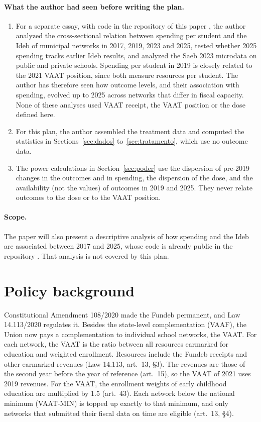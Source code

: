 \documentclass[11pt]{article}
\begin{document}
\paragraph{What the author had seen before writing the plan.}
\begin{enumerate}[label=(\alph*)]
\item For a separate essay, with code in the repository of this paper \citep{cunha2026}, the author analyzed the cross-sectional relation between spending per student and the Ideb of municipal networks in 2017, 2019, 2023 and 2025, tested whether 2025 spending tracks earlier Ideb results, and analyzed the Saeb 2023 microdata on public and private schools. Spending per student in 2019 is closely related to the 2021 VAAT position, since both measure resources per student. The author has therefore seen how outcome levels, and their association with spending, evolved up to 2025 across networks that differ in fiscal capacity. None of these analyses used VAAT receipt, the VAAT position or the dose defined here.
\item For this plan, the author assembled the treatment data and computed the statistics in Sections~\ref{sec:dados} to~\ref{sec:tratamento}, which use no outcome data.
\item The power calculations in Section~\ref{sec:poder} use the dispersion of pre-2019 changes in the outcomes and in spending, the dispersion of the dose, and the availability (not the values) of outcomes in 2019 and 2025. They never relate outcomes to the dose or to the VAAT position.
\end{enumerate}

\paragraph{Scope.} The paper will also present a descriptive analysis of how spending and the Ideb are associated between 2017 and 2025, whose code is already public in the repository \citep{cunha2026}. That analysis is not covered by this plan.

\section{Policy background}\label{sec:politica}

Constitutional Amendment 108/2020 made the Fundeb permanent, and Law 14.113/2020 regulates it. Besides the state-level complementation (VAAF), the Union now pays a complementation to individual school networks, the VAAT. For each network, the VAAT is the ratio between all resources earmarked for education and weighted enrollment. Resources include the Fundeb receipts and other earmarked revenues (Law 14.113, art.~13, \S3). The revenues are those of the second year before the year of reference (art.~15), so the VAAT of 2021 uses 2019 revenues. For the VAAT, the enrollment weights of early childhood education are multiplied by 1.5 (art.~43). Each network below the national minimum (VAAT-MIN) is topped up exactly to that minimum, and only networks that submitted their fiscal data on time are eligible (art.~13, \S4).
\end{document}

